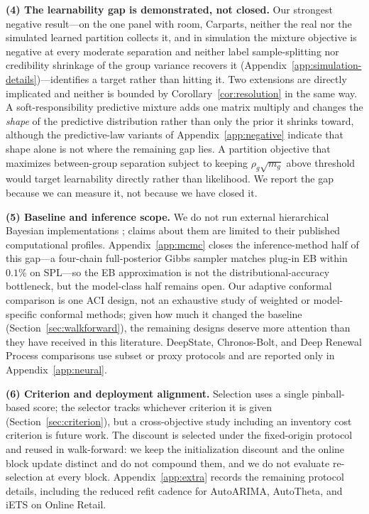 \documentclass[twoside]{article}
\theoremstyle{definition}
\begin{document}
\textbf{(4) The learnability gap is demonstrated, not closed.} %
Our
strongest negative result---on the one panel with room, Carparts, neither
the real nor the simulated learned partition collects it, and in
simulation the mixture objective is negative at every moderate
separation and neither label sample-splitting nor credibility shrinkage
of the group variance recovers it (Appendix~\ref{app:simulation-details})---identifies a target rather than hitting it. Two
extensions are directly implicated and neither is bounded by
Corollary~\ref{cor:resolution} in the same way. A soft-responsibility
predictive mixture adds one matrix multiply and changes the \emph{shape}
of the predictive distribution rather than only the prior it shrinks
toward, although the predictive-law variants of Appendix~\ref{app:negative}
indicate that shape alone is not where the remaining gap lies. A partition objective that maximizes between-group separation
subject to keeping $\rho_g\sqrt{m_g}$ above threshold would target
learnability directly rather than likelihood. We report the gap because we
can measure it, not because we have closed it.

\textbf{(5) Baseline and inference scope.} We do not run external
hierarchical Bayesian implementations
\citep{chapados2014,seeger2016,pitkin2024}; claims about them are limited
to their published computational profiles.
Appendix~\ref{app:mcmc} closes the inference-method half of this gap---a
four-chain full-posterior Gibbs sampler matches plug-in EB within $0.1\%$
on SPL---so the EB approximation is not the distributional-accuracy
bottleneck, but the model-class half remains open. Our adaptive conformal
comparison is one ACI design, not an exhaustive study of weighted or
model-specific conformal methods; given how much it changed the baseline
(Section~\ref{sec:walkforward}), the remaining designs deserve more
attention than they have received in this literature. DeepState,
Chronos-Bolt, and Deep Renewal Process comparisons use subset or proxy
protocols and are reported only in Appendix~\ref{app:neural}.

\textbf{(6) Criterion and deployment alignment.} Selection uses a single
pinball-based score; the selector tracks whichever criterion it is given
(Section~\ref{sec:criterion}), but a cross-objective study including an
inventory cost criterion is future work. The discount is selected under
the fixed-origin protocol and reused in walk-forward: we keep the
initialization discount and the online block update distinct and do not
compound them, and we do not evaluate re-selection at every block.
Appendix~\ref{app:extra} records the remaining protocol details, including
the reduced refit cadence for AutoARIMA, AutoTheta, and iETS on Online
Retail.
\end{document}
